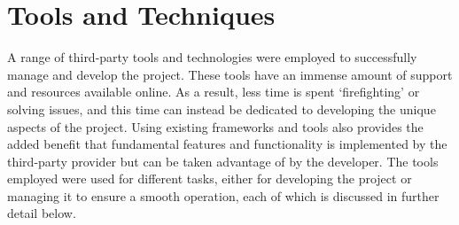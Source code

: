 \section{Tools and Techniques}
A range of third-party tools and technologies were employed to successfully manage and develop the project. These tools have an immense amount of support and resources available online. As a result, less time is spent `firefighting' or solving issues, and this time can instead be dedicated to developing the unique aspects of the project. Using existing frameworks and tools also provides the added benefit that fundamental features and functionality is implemented by the third-party provider but can be taken advantage of by the developer. The tools employed were used for different tasks, either for developing the project or managing it to ensure a smooth operation, each of which is discussed in further detail below.

